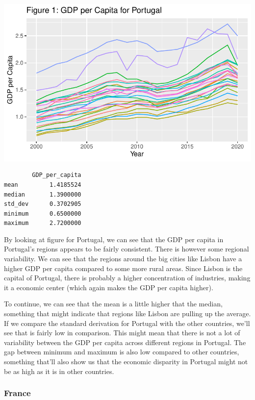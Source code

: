 \documentclass[
  a4paper,
  DIV=11,
  numbers=noendperiod]{scrartcl}
\begin{document}
\includegraphics{MSB104_GR_1_Final_Assignment_research_article_files/figure-pdf/unnamed-chunk-7-1.pdf}

\begin{verbatim}
        GDP_per_capita
mean         1.4185524
median       1.3900000
std_dev      0.3702905
minimum      0.6500000
maximum      2.7200000
\end{verbatim}

By looking at figure for Portugal, we can see that the GDP per capita in
Portugal's regions appears to be fairly consistent. There is however
some regional variability. We can see that the regions around the big
cities like Lisbon have a higher GDP per capita compared to some more
rural areas. Since Lisbon is the capital of Portugal, there is probably
a higher concentration of industries, making it a economic center (which
again makes the GDP per capita higher).

To continue, we can see that the mean is a little higher that the
median, something that might indicate that regions like Lisbon are
pulling up the average. If we compare the standard derivation for
Portugal with the other countries, we'll see that is fairly low in
comparison. This might mean that there is not a lot of variability
between the GDP per capita across different regions in Portugal. The gap
between minimum and maximum is also low compared to other countries,
something that'll also show us that the economic disparity in Portugal
might not be as high as it is in other countries.

\hypertarget{france}{%
\subsubsection{France}\label{france}}
\end{document}
